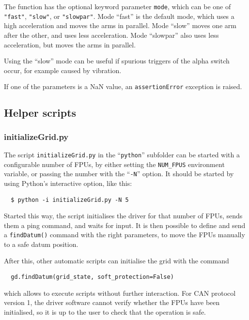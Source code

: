 \documentclass[11pt,a4paper]{scrartcl}
\begin{document}
The function has the optional keyword parameter \texttt{mode}, which
can be one of \texttt{"fast"}, \texttt{"slow"}, or \texttt{"slowpar"}.
Mode ``fast'' is the default mode, which uses a high acceleration and
moves the arms in parallel. Mode ``slow'' moves one arm after the
other, and uses less acceleration. Mode ``slowpar'' also uses less
acceleration, but moves the arms in parallel.

Using the ``slow'' mode can be useful if spurious triggers of the
alpha switch occur, for example caused by vibration.

If one of the parameters is a NaN value, an \texttt{assertionError}
exception is raised.

\subsection{Helper scripts}

\subsubsection{initializeGrid.py}
\label{sec:initializegrid}

The script \texttt{initializeGrid.py} in the ``\texttt{python}''
subfolder can be started with a configurable number of FPUs, by either
setting the \texttt{NUM\_FPUS} environment variable, or passing the
number with the ``\texttt{-N}'' option. It should be started by using
Python's interactive option, like this:

\begin{verbatim}
  $ python -i initializeGrid.py -N 5
\end{verbatim}

Started this way, the script initialises the driver for that number of
FPUs, sends them a ping command, and waits for input. It is then
possible to define and send a \texttt{findDatum()} command with the
right parameters, to move the FPUs manually to a safe datum position.

After this, other automatic scripts can initialise the grid with the
command

\begin{verbatim}
  gd.findDatum(grid_state, soft_protection=False)
\end{verbatim}

which allows to execute scripts without further interaction.  For CAN
protocol version 1, the driver software cannot verify whether the FPUs
have been initialised, so it is up to the user to check that the
operation is safe.
\end{document}
